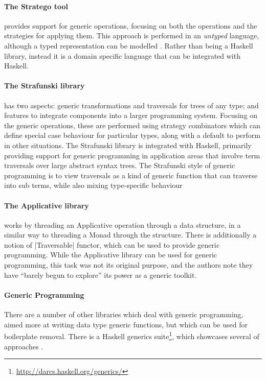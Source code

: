 \documentclass[preprint]{sigplanconf}
\let\cite=\citep
\begin{document}
\paragraph{The Stratego tool} \citep{stratego} provides support for generic operations, focusing on both the operations and the strategies for applying them. This approach is performed in an \textit{untyped} language, although a typed representation can be modelled \cite{lammel:typed_generic_strategies}. Rather than being a Haskell library, instead it is a domain specific language that can be integrated with Haskell.

\paragraph{The Strafunski library} \citep{strafunski, lammel:polymorphic_symphony} has two aspects: generic transformations and traversals for trees of any type; and features to integrate components into a larger programming system. Focusing on the generic operations, these are performed using strategy combinators which can define special case behaviour for particular types, along with a default to perform in other situations. The Strafunski library is integrated with Haskell, primarily providing support for generic programming in application areas that involve term traversals over large abstract syntax trees. The Strafunski style of generic programming is to view traversals as a kind of generic function that can traverse into sub terms, while also mixing type-specific behaviour

\paragraph{The Applicative library} \citep{mcbride:applicative} works by threading an Applicative operation through a data structure, in a similar way to threading a Monad through the structure. There is additionally a notion of |Traversable| functor, which can be used to provide generic programming. While the Applicative library can be used for generic programming, this task was not its original purpose, and the authors note they have ``barely begun to explore'' its power as a generic toolkit.

\paragraph{Generic Programming} There are a number of other libraries which deal with generic programming, aimed more at writing data type generic functions, but which can be used for boilerplate removal. There is a Haskell generics suite\footnote{\url{http://darcs.haskell.org/generics/}}, which showcases several of approaches \citep{weirich:replib,hinze:generics_masses,oleg:smash,hinze:generic_haskell}.
\end{document}
